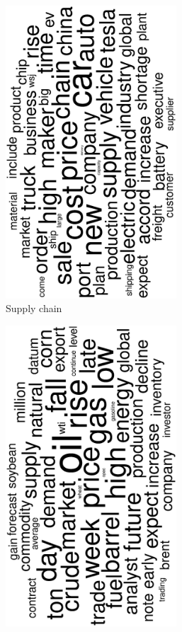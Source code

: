 \begin{figure}
\begin{subfigure}{0.32\textwidth}
		\includegraphics[width=0.7\textwidth,angle=270]{figures/wordcloud5.eps}
		\caption{Supply chain}
	\end{subfigure}
	\begin{subfigure}{0.32\textwidth}
		\includegraphics[width=0.7\textwidth,angle=270]{figures/wordcloud1.eps}

\end{subfigure}
\end{figure}
